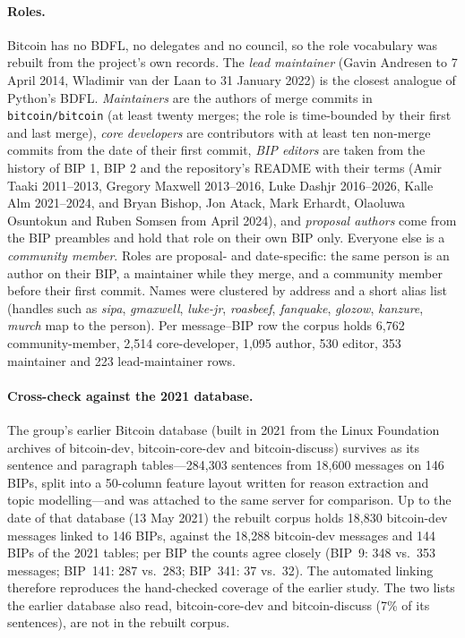 \paragraph{Roles.} Bitcoin has no BDFL, no delegates and no council, so the role vocabulary was rebuilt from the project's own records. The \emph{lead maintainer} (Gavin Andresen to 7 April 2014, Wladimir van der Laan to 31 January 2022) is the closest analogue of Python's BDFL. \emph{Maintainers} are the authors of merge commits in \texttt{bitcoin/bitcoin} (at least twenty merges; the role is time-bounded by their first and last merge), \emph{core developers} are contributors with at least ten non-merge commits from the date of their first commit, \emph{BIP editors} are taken from the history of BIP 1, BIP 2 and the repository's README with their terms (Amir Taaki 2011--2013, Gregory Maxwell 2013--2016, Luke Dashjr 2016--2026, Kalle Alm 2021--2024, and Bryan Bishop, Jon Atack, Mark Erhardt, Olaoluwa Osuntokun and Ruben Somsen from April 2024), and \emph{proposal authors} come from the BIP preambles and hold that role on their own BIP only. Everyone else is a \emph{community member}. Roles are proposal- and date-specific: the same person is an author on their BIP, a maintainer while they merge, and a community member before their first commit. Names were clustered by address and a short alias list (handles such as \emph{sipa}, \emph{gmaxwell}, \emph{luke-jr}, \emph{roasbeef}, \emph{fanquake}, \emph{glozow}, \emph{kanzure}, \emph{murch} map to the person). Per message--BIP row the corpus holds 6,762 community-member, 2,514 core-developer, 1,095 author, 530 editor, 353 maintainer and 223 lead-maintainer rows.

\paragraph{Cross-check against the 2021 database.} The group's earlier Bitcoin database (built in 2021 from the Linux Foundation archives of bitcoin-dev, bitcoin-core-dev and bitcoin-discuss) survives as its sentence and paragraph tables---284,303 sentences from 18,600 messages on 146 BIPs, split into a 50-column feature layout written for reason extraction and topic modelling---and was attached to the same server for comparison. Up to the date of that database (13 May 2021) the rebuilt corpus holds 18,830 bitcoin-dev messages linked to 146 BIPs, against the 18,288 bitcoin-dev messages and 144 BIPs of the 2021 tables; per BIP the counts agree closely (BIP~9: 348 vs.\ 353 messages; BIP~141: 287 vs.\ 283; BIP~341: 37 vs.\ 32). The automated linking therefore reproduces the hand-checked coverage of the earlier study. The two lists the earlier database also read, bitcoin-core-dev and bitcoin-discuss (7\% of its sentences), are not in the rebuilt corpus.

